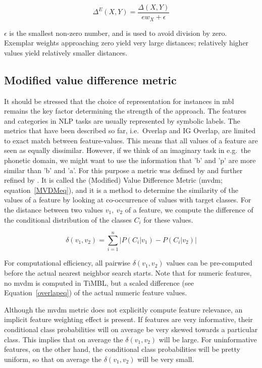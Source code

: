 \documentclass{report}
\begin{document}
\begin{equation}
\Delta^{E}(X,Y) = \frac{\Delta(X,Y)}{ew_{X} + \epsilon}
\label{exweight}
\end{equation}

$\epsilon$ is the smallest non-zero number, and is used to avoid
division by zero. Exemplar weights approaching zero yield very large
distances; relatively higher values yield relatively smaller
distances.


\subsection{Modified value difference metric}
\label{mvdm}

It should be stressed that the choice of representation for instances
in {\sc mbl} remains the key factor determining the strength of the
approach. The features and categories in NLP tasks are usually
represented by symbolic labels. The metrics that have been described
so far, i.e.~Overlap and IG Overlap, are limited to exact match
between feature-values. This means that all values of a feature are
seen as equally dissimilar. However, if we think of an imaginary task
in e.g.~the phonetic domain, we might want to use the information that
'b' and 'p' are more similar than 'b' and 'a'. For this purpose a
metric was defined by  and further refined by
. It is called the (Modified) Value Difference
Metric ({\sc mvdm}; equation~\ref{MVDMeq}), and it is a method to
determine the similarity of the values of a feature by looking at
co-occurrence of values with target classes. For the distance between
two values $v_{1},\ v_{2}$ of a feature, we compute the difference of
the conditional distribution of the classes $C_{i}$ for these values.

\begin{equation}
\delta(v_{1}, v_{2}) = \sum_{i=1}^{n} \left| P(C_{i}|v_{1}) - P(C_{i}|v_{2})
\right|
\label{MVDMeq}
\end{equation}

For computational efficiency, all pairwise $\delta(v_{1}, v_{2})$
values can be pre-comput\-ed before the actual nearest neighbor search
starts. Note that for numeric features, no {\sc mvdm} is computed in
TiMBL, but a scaled difference (see Equation~\ref{overlapeq}) of the
actual numeric feature values.

Although the {\sc mvdm} metric does not explicitly compute feature
relevance, an implicit feature weighting effect is present. If
features are very informative, their conditional class probabilities
will on average be very skewed towards a particular class. This
implies that on average the $\delta(v_{1}, v_{2})$ will be large. For
uninformative features, on the other hand, the conditional class
probabilities will be pretty uniform, so that on average the
$\delta(v_{1}, v_{2})$ will be very small.
\end{document}
